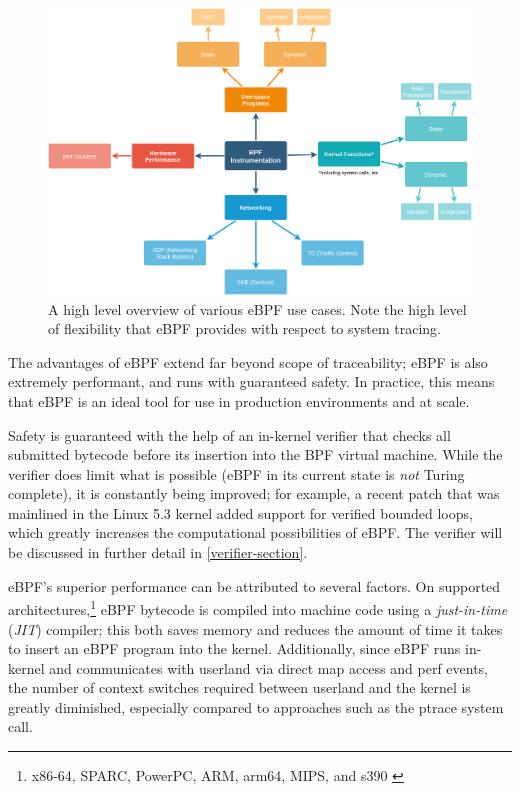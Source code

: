 \documentclass[
  12pt]{findlay}
\begin{document}
\begin{figure}
\includegraphics{../figures/eBPF-use-cases.png}
\caption[A high level overview of various eBPF use cases]{
A high level overview of various eBPF use cases.
Note the high level of flexibility that eBPF provides
with respect to system tracing.}
\label{ebpf-use-cases}
\end{figure}

The advantages of eBPF extend far beyond scope of traceability; eBPF is
also extremely performant, and runs with guaranteed safety. In practice,
this means that eBPF is an ideal tool for use in production environments
and at scale.

Safety is guaranteed with the help of an in-kernel verifier that checks
all submitted bytecode before its insertion into the BPF virtual
machine. While the verifier does limit what is possible (eBPF in its
current state is \emph{not} Turing complete), it is constantly being
improved; for example, a recent patch \autocite{starovoitov19} that was
mainlined in the Linux 5.3 kernel added support for verified bounded
loops, which greatly increases the computational possibilities of eBPF.
The verifier will be discussed in further detail in
\autoref{verifier-section}.

eBPF's superior performance can be attributed to several factors. On
supported
architectures,\footnote{x86-64, SPARC, PowerPC, ARM, arm64, MIPS, and s390 \cite{fleming17}}
eBPF bytecode is compiled into machine code using a \emph{just-in-time}
(\emph{JIT}) compiler; this both saves memory and reduces the amount of
time it takes to insert an eBPF program into the kernel. Additionally,
since eBPF runs in-kernel and communicates with userland via direct map
access and perf events, the number of context switches required between
userland and the kernel is greatly diminished, especially compared to
approaches such as the ptrace system call.
\end{document}
